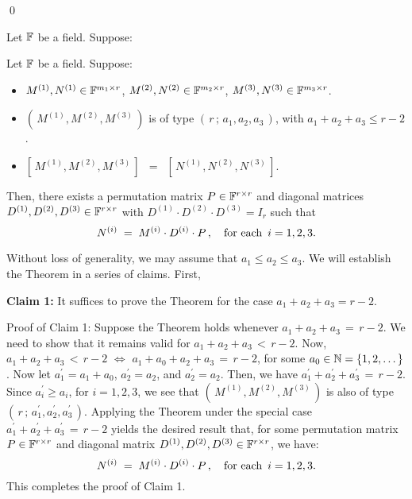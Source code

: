 \qed

\begin{corollary}\label{zeroZeroRminusTwo}
\mbox{}\vskip 0.1cm
\noindent
Let $\mathbb{F}$ be a field. Suppose:
\end{corollary}


\begin{theorem}
\label{KruskalTheorem}
\mbox{}\vskip 0.1cm
\noindent
Let $\mathbb{F}$ be a field. Suppose:
\begin{itemize}
\item
	$M^{(1)}, N^{(1)} \in \mathbb{F}^{m_{1} \times r}$,\;
	$M^{(2)}, N^{(2)} \in \mathbb{F}^{m_{2} \times r}$,\;
	$M^{(3)}, N^{(3)} \in \mathbb{F}^{m_{3} \times r}$.
\item
	$\left(\,M^{(1)},M^{(2)},M^{(3)}\,\right)$ is of type $\left(\,r\,;\,a_{1},a_{2},a_{3}\,\right)$,
	with $a_{1} + a_{2} + a_{3} \leq r - 2$.
\item
	$\left[\,M^{(1)},M^{(2)},M^{(3)}\,\right]$
	\,$=$\,
	$\left[\,N^{(1)},N^{(2)},N^{(3)}\,\right]$.
\end{itemize}
Then, there exists a permutation matrix $P \in \mathbb{F}^{r \times r}$ and diagonal matrices
$D^{(1)}, D^{(2)}, D^{(3)} \in \mathbb{F}^{r \times r}$ with $D^{(1)}\cdot D^{(2)}\cdot D^{(3)} = I_{r}$
such that
\begin{equation*}
N^{(i)} \; = \; M^{(i)} \cdot D^{(i)} \cdot P\,,
\quad
\textnormal{for each \,$i = 1,2,3$}.
\end{equation*}
\end{theorem}
\proof
Without loss of generality, we may assume that $a_{1} \leq a_{2} \leq a_{3}$.
We will establish the Theorem in a series of claims. First,

\begin{center}
\begin{minipage}{6.0in}
\textbf{Claim 1:}\; It suffices to prove the Theorem for the case $a_{1} + a_{2} + a_{3} = r - 2$.
\end{minipage}
\end{center}
Proof of Claim 1:\; Suppose the Theorem holds whenever $a_{1} + a_{2} + a_{3} \,=\, r - 2$.
We need to show that it remains valid for $a_{1} + a_{2} + a_{3} \,<\, r - 2$.
Now, $a_{1} + a_{2} + a_{3} \,<\, r - 2$ $\Longleftrightarrow$
$a_{1} + a_{0} + a_{2} + a_{3} \,=\, r - 2$, for some $a_{0} \in \mathbb{N} = \{1,2,\ldots\,\}$.
Now let $a^{\prime}_{1} = a_{1} + a_{0}$, $a^{\prime}_{2} = a_{2}$, and
$a^{\prime}_{2} = a_{2}$.
Then, we have $a^{\prime}_{1}+a^{\prime}_{2}+a^{\prime}_{3}\,=\,r-2$.
Since $a^{\prime}_{i} \geq a_{i}$, for $i = 1,2,3$, we see that
$\left(\,M^{(1)},M^{(2)},M^{(3)}\,\right)$ is also of type
$\left(\,r\,;\,a^{\prime}_{1},a^{\prime}_{2},a^{\prime}_{3}\,\right)$.
Applying the Theorem under the special case
$a^{\prime}_{1}+a^{\prime}_{2}+a^{\prime}_{3}\,=\,r-2$
yields the desired result that,
for some permutation matrix $P \in \mathbb{F}^{r \times r}$
and diagonal matrix $D^{(1)}, D^{(2)}, D^{(3)} \in \mathbb{F}^{r \times r}$,
we have:
\begin{equation*}
N^{(i)} \; = \; M^{(i)} \cdot D^{(i)} \cdot P\,,
\quad
\textnormal{for each \,$i = 1,2,3$}.
\end{equation*}
This completes the proof of Claim 1.

